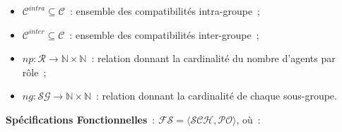 \documentclass[francais,ROIA,Unicode,manuscript]{cedram}
\begin{document}
\begin{itemize}
\begin{itemize}
              \item $\mathcal{C}^{intra} \subseteq \mathcal{C}$~: ensemble des compatibilités intra-groupe~;
              \item $\mathcal{C}^{inter} \subseteq \mathcal{C}$~: ensemble des compatibilités inter-groupe~;
              \item $np: \mathcal{R} \rightarrow \mathbb{N} \times \mathbb{N}$~: relation donnant la cardinalité du nombre d'agents par rôle~;
              \item $ng: \mathcal{SG} \rightarrow \mathbb{N} \times \mathbb{N}$~: relation donnant la cardinalité de chaque sous-groupe.
          \end{itemize}
\end{itemize}

\medskip

\noindent \textbf{Spécifications Fonctionnelles}~: \quad $\mathcal{FS} = \langle \mathcal{SCH}, \mathcal{PO} \rangle$, où~:
\end{document}
